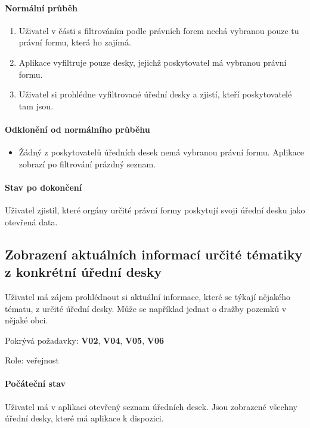 \paragraph{Normální průběh}
\begin{enumerate}
    \item Uživatel v části s filtrováním podle právních forem nechá vybranou pouze tu právní formu, která ho zajímá.
    \item Aplikace vyfiltruje pouze desky, jejichž poskytovatel má vybranou právní formu.
    \item Uživatel si prohlédne vyfiltrované úřední desky a zjistí, kteří poskytovatelé tam jsou.
\end{enumerate}

\paragraph{Odklonění od normálního průběhu}
\begin{itemize}
    \item Žádný z poskytovatelů úředních desek nemá vybranou právní formu. Aplikace zobrazí po filtrování prázdný seznam.
\end{itemize}

\paragraph{Stav po dokončení}
Uživatel zjistil, které orgány určité právní formy poskytují svoji úřední desku jako otevřená data.


\subsection{Zobrazení aktuálních informací určité tématiky z konkrétní úřední desky}
\label{use-case:info}

Uživatel má zájem prohlédnout si aktuální informace, které se týkají nějakého tématu, z určité úřední desky. Může se například jednat o dražby pozemků v nějaké obci.

Pokrývá požadavky: \textbf{V02}, \textbf{V04}, \textbf{V05}, \textbf{V06}

Role: veřejnost

\paragraph{Počáteční stav} 
Uživatel má v aplikaci otevřený seznam úředních desek. Jsou zobrazené všechny úřední desky, které má aplikace k dispozici.

